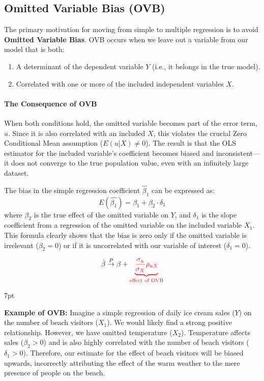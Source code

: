 \documentclass{article}
\providecommand{\tightlist}{
  \setlength{\itemsep}{0pt}
  \setlength{\parskip}{0pt}}
\newenvironment{redblock}{
\def\FrameCommand{
  \hspace{1pt}
    {\color{LightCoral}
    \vrule width 2pt}
    {\color{redshade}
    \vrule width 4pt}
  \colorbox{redshade}
}
\MakeFramed{
  \advance
  \hsize-
  \width
  \FrameRestore}
\noindent\hspace{-4.55pt}%
\begin{adjustwidth}{}{7pt}
\vspace{2pt}\vspace{2pt}
}
{\vspace{2pt}\end{adjustwidth}\endMakeFramed}
\begin{document}
\subsection{Omitted Variable Bias (OVB)}
\label{sub:ovb}

The primary motivation for moving from simple to multiple regression is to avoid \textbf{Omitted Variable Bias}. OVB occurs when we leave out a variable from our model that is both:
\begin{enumerate}
    \tightlist
    \item A determinant of the dependent variable $Y$ (i.e., it belongs in the true model).
    \item Correlated with one or more of the included independent variables $X$.
\end{enumerate}

\paragraph{The Consequence of OVB}
When both conditions hold, the omitted variable becomes part of the error term, $u$. Since it is also correlated with an included $X$, this violates the crucial Zero Conditional Mean assumption ($E(u|X) \neq 0$). The result is that the OLS estimator for the included variable's coefficient becomes biased and inconsistent—it does not converge to the true population value, even with an infinitely large dataset.

The bias in the simple regression coefficient $\hat{\beta_1}$ can be expressed as:
\begin{equation}
  E(\hat{\beta_1}) = \beta_1 + \beta_2 \cdot \delta_1
\end{equation}
where $\beta_2$ is the true effect of the omitted variable on $Y$, and $\delta_1$ is the slope coefficient from a regression of the omitted variable on the included variable $X_1$. This formula clearly shows that the bias is zero only if the omitted variable is irrelevant ($\beta_2=0$) or if it is uncorrelated with our variable of interest ($\delta_1=0$).

\begin{equation}
  \hat{\beta}\stackrel{P}{\rightarrow}\beta+
  {\color{red}
  \underbrace{\frac{\sigma_u}{\sigma_X}\rho_{uX}}_{\text{effect of OVB}}
  }
\end{equation}


\begin{redblock}
\textbf{Example of OVB:} Imagine a simple regression of daily ice cream sales ($Y$) on the number of beach visitors ($X_1$). We would likely find a strong positive relationship. However, we have omitted temperature ($X_2$). Temperature affects sales ($\beta_2 > 0$) and is also highly correlated with the number of beach visitors ($\delta_1 > 0$). Therefore, our estimate for the effect of beach visitors will be biased upwards, incorrectly attributing the effect of the warm weather to the mere presence of people on the beach.
\end{redblock}
\end{document}
